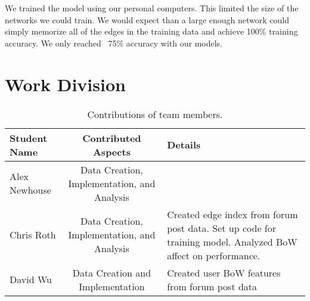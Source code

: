 \documentclass[10pt,twocolumn,letterpaper]{article}
\begin{document}
We trained the model using our personal computers. This limited the size of the networks we could train. We would expect than a large enough network could simply memorize all of the edges in the training data and achieve 100\% training accuracy. We only reached ~75\% accuracy with our models. 
\section{Work Division}

\begin{table*}
\begin{center}
\begin{tabular}{|l|c|p{8cm}|}
\hline
Student Name & Contributed Aspects & Details \\
\hline\hline
Alex Newhouse & Data Creation, Implementation, and Analysis &  \\
Chris Roth & Data Creation, Implementation, and Analysis & Created edge index from forum post data. Set up code for training model. Analyzed BoW affect on performance. \\
David Wu & Data Creation and Implementation & Created user BoW features from forum post data \\
\hline
\end{tabular}
\end{center}
\caption{Contributions of team members.}
\label{tab:contributions}
\end{table*}







\end{document}
